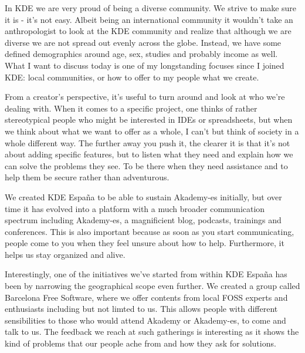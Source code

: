 

\noindent{}In KDE we are very proud of being a diverse community. We strive to make sure it is - it's not easy. Albeit being an international community it wouldn't take an anthropologist to look at the KDE community and realize that although we are diverse we are not spread out evenly across the globe. Instead, we have some defined demographics around age, sex, studies and probably income as well. What I want to discuss today is one of my longstanding focuses since I joined KDE: local communities, or how to offer to my people what we create.

From a creator's perspective, it's useful to turn around and look at who we're dealing with. When it comes to a specific project, one thinks of rather stereotypical people who might be interested in IDEs or spreadsheets, but when we think about what we want to offer as a whole, I can't but think of society in a whole different way. The further away you push it, the clearer it is that it's not about adding specific features, but to listen what they need and explain how we can solve the problems they see. To be there when they need assistance and to help them be secure rather than adventurous.

We created KDE España to be able to sustain Akademy-es initially, but over time it has evolved into a platform with a much broader communication spectrum including Akademy-es, a magnificient blog, podcasts, trainings and conferences. This is also important because as soon as you start communicating, people come to you when they feel unsure about how to help. Furthermore, it helps us stay organized and alive.

Interestingly, one of the initiatives we've started from within KDE España has been by narrowing the geographical scope even further. We created a group called Barcelona Free Software, where we offer contents from local FOSS experts and enthusiasts including but not limted to us. This allows people with different sensibilities to those who would attend Akademy or Akademy-es, to come and talk to us. The feedback we reach at such gatherings is interesting as it shows the kind of problems that our people ache from and how they ask for solutions.

